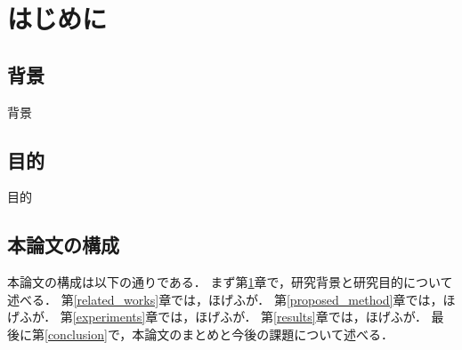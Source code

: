 \chapter{はじめに}
\label{introduction}
\setcounter{page}{1}

\section{背景}

背景

\section{目的}

目的

\section{本論文の構成}

本論文の構成は以下の通りである．
まず第\ref{introduction}章で，研究背景と研究目的について述べる．
第\ref{related_works}章では，ほげふが．
第\ref{proposed_method}章では，ほげふが．
第\ref{experiments}章では，ほげふが．
第\ref{results}章では，ほげふが．
最後に第\ref{conclusion}で，本論文のまとめと今後の課題について述べる．
